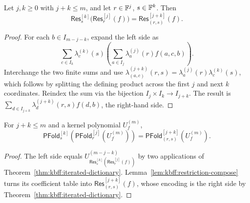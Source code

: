 \begin{lemma}\label{lem:kbff:restriction-compose}
Let $j,k\geq0$ with $j+k\leq m$, and let
$r\in\mathbb{F}^j$, $s\in\mathbb{F}^k$. Then
\[
 \mathsf{Res}^{[k]}_s\bigl(\mathsf{Res}^{[j]}_r(f)\bigr)
 =\mathsf{Res}^{[j+k]}_{(r,s)}(f).
\]
\end{lemma}
\begin{proof}
For each $b\in I_{m-j-k}$, expand the left side as
\[
 \sum_{c\in I_k}\lambda_c^{(k)}(s)
 \left(\sum_{a\in I_j}\lambda_a^{(j)}(r)f(a,c,b)\right).
\]
Interchange the two finite sums and use
$\lambda_{(a,c)}^{(j+k)}(r,s)=\lambda_a^{(j)}(r)\lambda_c^{(k)}(s)$,
which follows by splitting the defining product across the first
$j$ and next $k$ coordinates. Reindex the sum via the bijection
$I_j\times I_k\to I_{j+k}$. The result is
$\sum_{d\in I_{j+k}}\lambda_d^{(j+k)}(r,s)f(d,b)$,
the right-hand side.
\end{proof}

\begin{corollary}\label{cor:kbff:fold-compose}
For $j+k\leq m$ and a kernel polynomial $U_f^{(m)}$,
\[
 \mathsf{PFold}^{[k]}_s
 \left(\mathsf{PFold}^{[j]}_r(U_f^{(m)})\right)
 =\mathsf{PFold}^{[j+k]}_{(r,s)}(U_f^{(m)}).
\]
\end{corollary}
\begin{proof}
The left side equals
$U_{\mathsf{Res}^{[k]}_s(\mathsf{Res}^{[j]}_r(f))}^{(m-j-k)}$
by two applications of Theorem~\ref{thm:kbff:iterated-dictionary}. Lemma~\ref{lem:kbff:restriction-compose} turns its coefficient table into
$\mathsf{Res}^{[j+k]}_{(r,s)}(f)$, whose encoding is the right side by Theorem~\ref{thm:kbff:iterated-dictionary}.
\end{proof}
